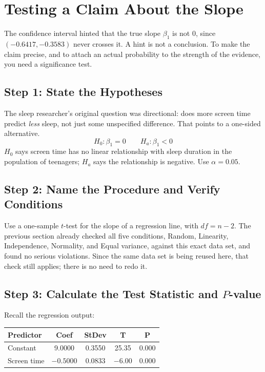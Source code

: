 \section{Testing a Claim About the Slope}

The confidence interval hinted that the true slope $\beta_1$ is not $0$, since $(-0.6417, -0.3583)$ never crosses it. A hint is not a conclusion. To make the claim precise, and to attach an actual probability to the strength of the evidence, you need a significance test.

\subsection*{Step 1: State the Hypotheses}

The sleep researcher's original question was directional: does more screen time predict \emph{less} sleep, not just some unspecified difference. That points to a one-sided alternative.
\[
H_0: \beta_1 = 0 \qquad H_a: \beta_1 < 0
\]
$H_0$ says screen time has no linear relationship with sleep duration in the population of teenagers; $H_a$ says the relationship is negative. Use $\alpha = 0.05$.

\subsection*{Step 2: Name the Procedure and Verify Conditions}

Use a one-sample $t$-test for the slope of a regression line, with $df = n - 2$. The previous section already checked all five conditions, Random, Linearity, Independence, Normality, and Equal variance, against this exact data set, and found no serious violations. Since the same data set is being reused here, that check still applies; there is no need to redo it.

\subsection*{Step 3: Calculate the Test Statistic and $P$-value}

Recall the regression output:

\begin{center}
\begin{tabular}{|l|c|c|c|c|}
\hline
Predictor & Coef & StDev & T & P \\
\hline
Constant & 9.0000 & 0.3550 & 25.35 & 0.000 \\
Screen time & $-0.5000$ & 0.0833 & $-6.00$ & 0.000 \\
\hline
\end{tabular}
\end{center}

